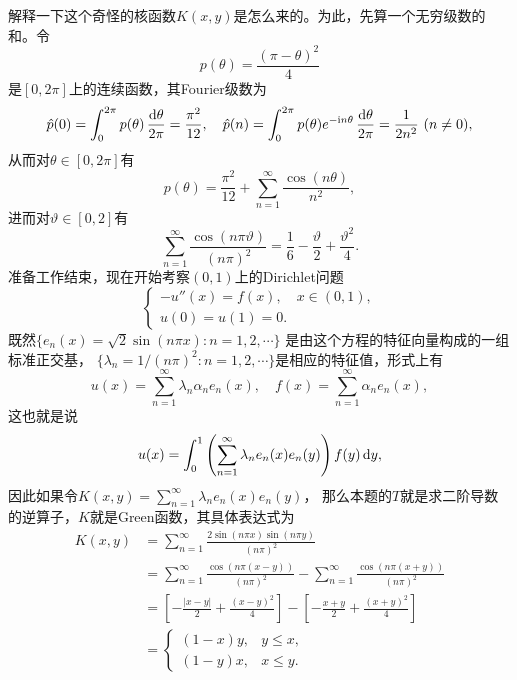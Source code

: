 \begin{remark*}
    解释一下这个奇怪的核函数$K(x,y)$是怎么来的。为此，先算一个无穷级数的和。令
    \[p(\theta)=\frac{(\pi-\theta)^2}{4}\]
    是$[0,2\pi]$上的连续函数，其Fourier级数为
    \[\hat{p}(0)=\int_0^{2\pi}p(\theta)\,\frac{{\rm d}\theta}{2\pi}=\frac{\pi^2}{12},\quad
    \hat{p}(n)=\int_0^{2\pi}p(\theta)e^{-{\rm i}n\theta}\,\frac{{\rm d}\theta}{2\pi}=\frac{1}{2n^2}\ (n\ne0),\]
    从而对$\theta\in[0,2\pi]$有
    \[p(\theta)=\frac{\pi^2}{12}+\sum_{n=1}^{\infty}\frac{\cos(n\theta)}{n^2},\]
    进而对$\vartheta\in[0,2]$有
    \[\sum_{n=1}^{\infty}\frac{\cos(n\pi\vartheta)}{(n\pi)^2}
    =\frac{1}{6}-\frac{\vartheta}{2}+\frac{\vartheta^2}{4}.\]
    准备工作结束，现在开始考察$(0,1)$上的Dirichlet问题
    \[\begin{cases}-u''(x)=f(x), \quad x\in(0,1),\\u(0)=u(1)=0.\end{cases}\]
    既然$\{e_n(x)=\sqrt{2}\sin(n\pi x):n=1,2,\cdots\}$
    是由这个方程的特征向量构成的一组标准正交基，
    $\{\lambda_n=1/(n\pi)^2:n=1,2,\cdots\}$是相应的特征值，形式上有
    \[u(x)=\sum_{n=1}^{\infty}\lambda_n\alpha_ne_n(x),
    \quad f(x)=\sum_{n=1}^{\infty}\alpha_ne_n(x),\]
    这也就是说
    \[u(x)=\int_0^1\left(\sum_{n=1}^{\infty}\lambda_ne_n(x)e_n(y)\right)f(y)\,{\rm d}y,\]
    因此如果令$\displaystyle K(x,y)=\sum_{n=1}^{\infty}\lambda_ne_n(x)e_n(y)$，
    那么本题的$T$就是求二阶导数的逆算子，$K$就是Green函数，其具体表达式为
    \begin{align*}
        K(x,y)&=\sum_{n=1}^{\infty}\frac{2\sin(n\pi x)\sin(n\pi y)}{(n\pi)^2}\\
        &=\sum_{n=1}^{\infty}\frac{\cos(n\pi(x-y))}{(n\pi)^2}
        -\sum_{n=1}^{\infty}\frac{\cos(n\pi(x+y))}{(n\pi)^2}\\
        &=\left[-\frac{|x-y|}{2}+\frac{(x-y)^2}{4}\right]
        -\left[-\frac{x+y}{2}+\frac{(x+y)^2}{4}\right]\\
        &=\begin{cases}(1-x)y,&y \leqslant x,\\
        (1-y)x,&x \leqslant y.\end{cases}
    \end{align*}
\end{remark*}

